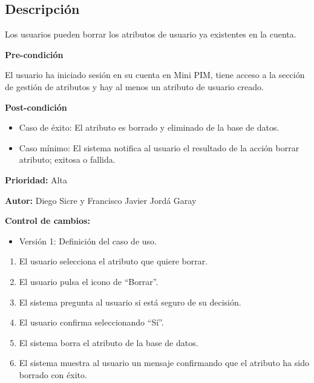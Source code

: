 
\subsection*{Descripción}
Los usuarios pueden borrar los atributos de usuario ya existentes en la cuenta.
\vspace{0.15cm}

\textbf{Pre-condición}\par
El usuario ha iniciado sesión en su cuenta en Mini PIM, tiene acceso a la sección de gestión de atributos y hay al menos un atributo de usuario creado.\par
\vspace{0.15cm}

\textbf{Post-condición}
\begin{itemize}
    \item Caso de éxito: El atributo es borrado y eliminado de la base de datos.
    \item Caso mínimo: El sistema notifica al usuario el resultado de la acción borrar atributo; exitosa o fallida.
\end{itemize}

\textbf{Prioridad: }
Alta
\vspace{0.15cm}

\textbf{Autor: }
Diego Sicre y Francisco Javier Jordá Garay\par
\vspace{0.15cm}

\textbf{Control de cambios: }
\begin{itemize}
    \item Versión 1: Definición del caso de uso.
\end{itemize}


\begin{enumerate}
    \item El usuario selecciona el atributo que quiere borrar.
    \item El usuario pulsa el icono de \enquote{Borrar}.
    \item El sistema pregunta al usuario si está seguro de su decisión.
    \item El usuario confirma seleccionando \enquote{Sí}.
    \item El sistema borra el atributo de la base de datos.
    \item El sistema muestra al usuario un mensaje confirmando que el atributo ha sido borrado con éxito.
\end{enumerate}

